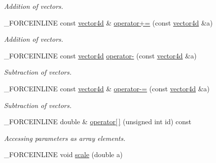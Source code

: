 \begin{DoxyCompactItemize}
\begin{DoxyCompactList}\small\item\em Addition of vectors. \end{DoxyCompactList}\item 
\hypertarget{classbt_1_1vector4d_a5bf6c6ed1d8260acd82efa430950490d}{\-\_\-\-F\-O\-R\-C\-E\-I\-N\-L\-I\-N\-E const \hyperlink{classbt_1_1vector4d}{vector4d} \& \hyperlink{classbt_1_1vector4d_a5bf6c6ed1d8260acd82efa430950490d}{operator+=} (const \hyperlink{classbt_1_1vector4d}{vector4d} \&a)}\label{classbt_1_1vector4d_a5bf6c6ed1d8260acd82efa430950490d}

\begin{DoxyCompactList}\small\item\em Addition of vectors. \end{DoxyCompactList}\item 
\hypertarget{classbt_1_1vector4d_a4dbdcb5cbdc8c7d279a2bbcaaf2697da}{\-\_\-\-F\-O\-R\-C\-E\-I\-N\-L\-I\-N\-E const \hyperlink{classbt_1_1vector4d}{vector4d} \hyperlink{classbt_1_1vector4d_a4dbdcb5cbdc8c7d279a2bbcaaf2697da}{operator-\/} (const \hyperlink{classbt_1_1vector4d}{vector4d} \&a)}\label{classbt_1_1vector4d_a4dbdcb5cbdc8c7d279a2bbcaaf2697da}

\begin{DoxyCompactList}\small\item\em Subtraction of vectors. \end{DoxyCompactList}\item 
\hypertarget{classbt_1_1vector4d_a5d96d1d7383b1bb6fac96d57ac14afb7}{\-\_\-\-F\-O\-R\-C\-E\-I\-N\-L\-I\-N\-E const \hyperlink{classbt_1_1vector4d}{vector4d} \& \hyperlink{classbt_1_1vector4d_a5d96d1d7383b1bb6fac96d57ac14afb7}{operator-\/=} (const \hyperlink{classbt_1_1vector4d}{vector4d} \&a)}\label{classbt_1_1vector4d_a5d96d1d7383b1bb6fac96d57ac14afb7}

\begin{DoxyCompactList}\small\item\em Subtraction of vectors. \end{DoxyCompactList}\item 
\hypertarget{classbt_1_1vector4d_a562e6f404e9be83ba0daf4a714166cd5}{\-\_\-\-F\-O\-R\-C\-E\-I\-N\-L\-I\-N\-E double \& \hyperlink{classbt_1_1vector4d_a562e6f404e9be83ba0daf4a714166cd5}{operator\mbox{[}$\,$\mbox{]}} (unsigned int id) const }\label{classbt_1_1vector4d_a562e6f404e9be83ba0daf4a714166cd5}

\begin{DoxyCompactList}\small\item\em Accessing parameters as array elements. \end{DoxyCompactList}\item 
\hypertarget{classbt_1_1vector4d_a8e045cc2adc3dcd102dcd62e7cbf4bdc}{\-\_\-\-F\-O\-R\-C\-E\-I\-N\-L\-I\-N\-E void \hyperlink{classbt_1_1vector4d_a8e045cc2adc3dcd102dcd62e7cbf4bdc}{scale} (double a)}\label{classbt_1_1vector4d_a8e045cc2adc3dcd102dcd62e7cbf4bdc}


\end{DoxyCompactItemize}
